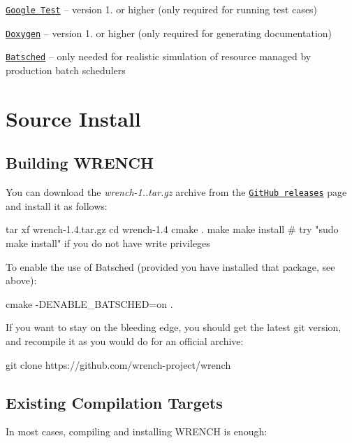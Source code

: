 \begin{DoxyItemize}
\item \href{https://github.com/google/googletest}{\tt Google Test} -- version 1. or higher (only required for running test cases)
\item \href{http://www.doxygen.org}{\tt Doxygen} -- version 1. or higher (only required for generating documentation)
\item \href{https://gitlab.inria.fr/batsim/batsched}{\tt Batsched} -- only needed for realistic simulation of resource managed by production batch schedulers
\end{DoxyItemize}\hypertarget{install_install-source}{}\section{Source Install}\label{install_install-source}
\hypertarget{install_install-source-build}{}\subsection{Building W\+R\+E\+N\+CH}\label{install_install-source-build}
You can download the {\itshape wrench-\/1..\+tar.\+gz} archive from the \href{https://github.com/wrench-project/wrench/releases}{\tt Git\+Hub releases} page and install it as follows\+:


\begin{DoxyCode}
tar xf wrench-1.4.tar.gz
cd wrench-1.4
cmake .
make
make install # try "sudo make install" if you do not have write privileges
\end{DoxyCode}


To enable the use of Batsched (provided you have installed that package, see above)\+: 
\begin{DoxyCode}
cmake -DENABLE\_BATSCHED=on .
\end{DoxyCode}


If you want to stay on the bleeding edge, you should get the latest git version, and recompile it as you would do for an official archive\+:


\begin{DoxyCode}
git clone https://github.com/wrench-project/wrench
\end{DoxyCode}
\hypertarget{install_install-source-targets}{}\subsection{Existing Compilation Targets}\label{install_install-source-targets}
In most cases, compiling and installing W\+R\+E\+N\+CH is enough\+:



